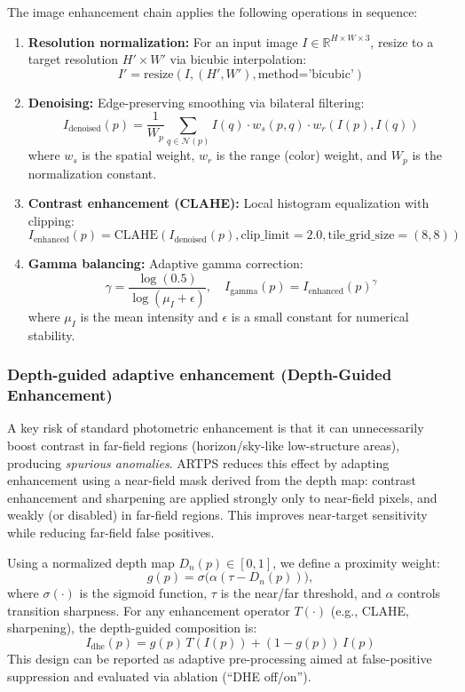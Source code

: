 \documentclass[12pt]{article}
\begin{document}
The image enhancement chain applies the following operations in sequence:

\begin{enumerate}
\item \textbf{Resolution normalization:} For an input image \(I \in \mathbb{R}^{H \times W \times 3}\), resize to a target resolution \(H' \times W'\) via bicubic interpolation:
\[ I' = \text{resize}(I, (H', W'), \text{method='bicubic'}) \]

\item \textbf{Denoising:} Edge-preserving smoothing via bilateral filtering:
\[ I_{\text{denoised}}(p) = \frac{1}{W_p} \sum_{q \in \mathcal{N}(p)} I(q) \cdot w_s(p,q) \cdot w_r(I(p), I(q)) \]
where \(w_s\) is the spatial weight, \(w_r\) is the range (color) weight, and \(W_p\) is the normalization constant.

\item \textbf{Contrast enhancement (CLAHE):} Local histogram equalization with clipping:
\[ I_{\text{enhanced}}(p) = \text{CLAHE}(I_{\text{denoised}}(p), \text{clip\_limit}=2.0, \text{tile\_grid\_size}=(8,8)) \]

\item \textbf{Gamma balancing:} Adaptive gamma correction:
\[ \gamma = \frac{\log(0.5)}{\log(\mu_I + \epsilon)}, \quad I_{\text{gamma}}(p) = I_{\text{enhanced}}(p)^{\gamma} \]
where \(\mu_I\) is the mean intensity and \(\epsilon\) is a small constant for numerical stability.
\end{enumerate}

\subsubsection{Depth-guided adaptive enhancement (Depth-Guided Enhancement)}
A key risk of standard photometric enhancement is that it can unnecessarily boost contrast in far-field regions (horizon/sky-like low-structure areas), producing \emph{spurious anomalies}. ARTPS reduces this effect by adapting enhancement using a near-field mask derived from the depth map: contrast enhancement and sharpening are applied strongly only to near-field pixels, and weakly (or disabled) in far-field regions. This improves near-target sensitivity while reducing far-field false positives.

Using a normalized depth map \(D_n(p)\in[0,1]\), we define a proximity weight:
\[
g(p)=\sigma\big(\alpha(\tau - D_n(p))\big),
\]
where \(\sigma(\cdot)\) is the sigmoid function, \(\tau\) is the near/far threshold, and \(\alpha\) controls transition sharpness. For any enhancement operator \(T(\cdot)\) (e.g., CLAHE, sharpening), the depth-guided composition is:
\[
I_{\text{dhe}}(p) = g(p)\, T(I(p)) + (1-g(p))\, I(p)
\]
This design can be reported as adaptive pre-processing aimed at false-positive suppression and evaluated via ablation (“DHE off/on”).
\end{document}
